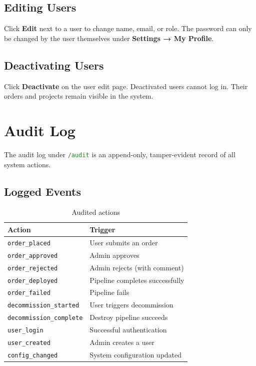 \documentclass[12pt,a4paper,twoside]{report}
\newcommand{\code}[1]{\texttt{#1}}
\newcommand{\route}[1]{\texttt{\textcolor{ForestGreen}{#1}}}
\begin{document}
\section{Editing Users}

Click \textbf{Edit} next to a user to change name, email, or role.
The password can only be changed by the user themselves under
\textbf{Settings → My Profile}.

\section{Deactivating Users}

Click \textbf{Deactivate} on the user edit page. Deactivated users
cannot log in. Their orders and projects remain visible in the system.

\chapter{Audit Log}
\label{ch:audit}

The audit log under \route{/audit} is an append-only, tamper-evident
record of all system actions.

\section{Logged Events}

\begin{table}[H]
  \centering
  \caption{Audited actions}
  \begin{tabular}{@{}ll@{}}
    \toprule
    \textbf{Action} & \textbf{Trigger} \\
    \midrule
    \code{order\_placed}      & User submits an order \\
    \code{order\_approved}    & Admin approves \\
    \code{order\_rejected}    & Admin rejects (with comment) \\
    \code{order\_deployed}    & Pipeline completes successfully \\
    \code{order\_failed}      & Pipeline fails \\
    \code{decommission\_started}  & User triggers decommission \\
    \code{decommission\_complete} & Destroy pipeline succeeds \\
    \code{user\_login}        & Successful authentication \\
    \code{user\_created}      & Admin creates a user \\
    \code{config\_changed}    & System configuration updated \\
    \bottomrule
  \end{tabular}
\end{table}
\end{document}
